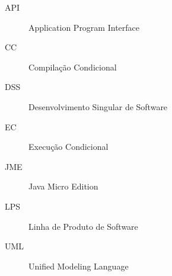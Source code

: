 
\begin{description}
  \item[API] Application Program Interface
  \item[CC]  Compilação Condicional
  \item[DSS] Desenvolvimento Singular de Software
  \item[EC]  Execução Condicional
  \item[JME] Java Micro Edition
  \item[LPS] Linha de Produto de Software
  \item[UML] Unified Modeling Language
\end{description}
